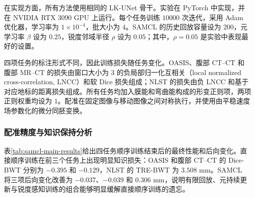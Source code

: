 在实现方面，所有方法使用相同的 LK-UNet 骨干。实验在 PyTorch 中实现，并在 NVIDIA RTX 3090 GPU 上运行。每个任务训练 $10000$ 次迭代，采用 Adam 优化器\cite{kingma2015adam}，学习率为 $1\times10^{-4}$，批大小为 $4$。SAMCL 的历史回放容量设为 $200$，元学习率 $\beta$ 设为 $0.25$，锐度邻域半径 $\rho$ 设为 $0.05$；其中，$\rho=0.05$ 是实验中表现最好的设置。

四项任务的标注形式不同，因此训练损失随任务变化。OASIS、腹部 CT--CT 和腹部 MR--CT 的损失由窗口大小为 $3$ 的负局部归一化互相关（local normalized cross-correlation, LNCC）和软 Dice 损失组成\cite{avants2008syn,hu2018weakreg}；NLST 的损失由负 LNCC 和基于对应地标的距离损失组成。所有任务均加入膜能和弯曲能构成的形变正则项，两项正则权重均设为 $1$。配准在固定图像与移动图像之间对称执行，并使用由平稳速度场参数化的微分同胚变换。

\subsubsection{配准精度与知识保持分析}
\label{subsubsec:samcl-analysis}

表\ref{tab:samcl-main-results}给出四任务顺序训练结束后的最终性能和后向变化。直接顺序训练在前三个任务上出现明显知识损失：OASIS 和腹部 CT--CT 的 Dice-BWT 分别为 $-0.395$ 和 $-0.129$，NLST 的 TRE-BWT 为 $3.508$ mm。SAMCL 将三项后向变化改善为 $-0.037$、$-0.039$ 和 $0.306$ mm，说明有限回放、元持续更新与锐度感知训练的组合能够明显缓解直接顺序训练的遗忘。

